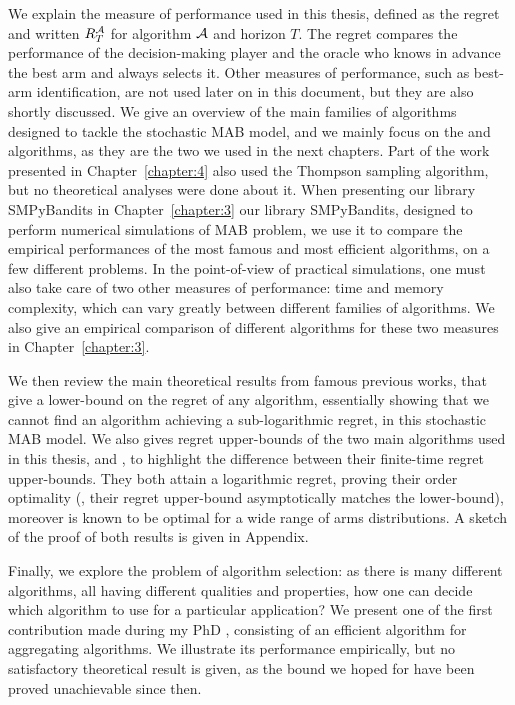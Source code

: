 We explain the measure of performance used in this thesis, defined as the regret and written $R_T^{\mathcal{A}}$ for algorithm $\mathcal{A}$ and horizon $T$. The regret compares the performance of the decision-making player and the oracle who knows in advance the best arm and always selects it.
Other measures of performance, such as best-arm identification, are not used later on in this document, but they are also shortly discussed.
%
We give an overview of the main families of algorithms designed to tackle the stochastic MAB model, and we mainly focus on the \UCB{} and \klUCB{} algorithms, as they are the two we used in the next chapters.
Part of the work presented in Chapter~\ref{chapter:4} also used the Thompson sampling algorithm, but no theoretical analyses were done about it.
When presenting our library SMPyBandits in Chapter~\ref{chapter:3} our library SMPyBandits, designed to perform numerical simulations of MAB problem, we use it to compare the empirical performances of the most famous and most efficient algorithms, on a few different problems.
%
In the point-of-view of practical simulations, one must also take care of two other measures of performance: time and memory complexity, which can vary greatly between different families of algorithms.
We also give an empirical comparison of different algorithms for these two measures in Chapter~\ref{chapter:3}.

We then review the main theoretical results from famous previous works, that give a lower-bound on the regret of any algorithm, essentially showing that we cannot find an algorithm achieving a sub-logarithmic regret, in this stochastic MAB model.
We also gives regret upper-bounds of the two main algorithms used in this thesis, \UCB{} and \klUCB, to highlight the difference between their finite-time regret upper-bounds. They both attain a logarithmic regret, proving their order optimality (\ie, their regret upper-bound asymptotically matches the lower-bound), moreover \klUCB{} is known to be optimal for a wide range of arms distributions.
A sketch of the proof of both results is given in Appendix.

Finally, we explore the problem of algorithm selection: as there is many different algorithms, all having different qualities and properties, how one can decide which algorithm to use for a particular application?
We present one of the first contribution made during my PhD \cite{Besson2018WCNC}, consisting of an efficient algorithm for aggregating algorithms. We illustrate its performance empirically, but no satisfactory theoretical result is given, as the bound we hoped for have been proved unachievable since then.


